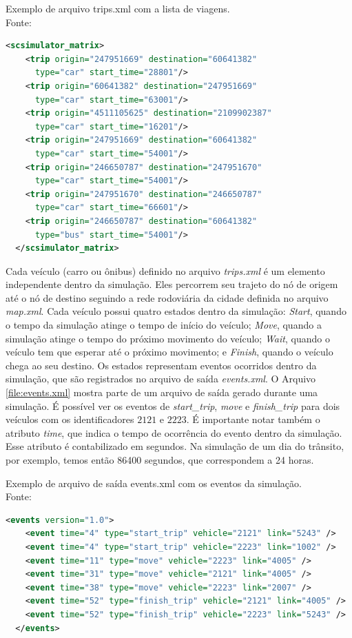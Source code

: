 {\begin{programruledcaption}{Exemplo de arquivo trips.xml com a lista de viagens. \\Fonte: \citet{mabs2017} \label{file:trips.xml}}
  \begin{lstlisting}[language=XML]
  <scsimulator_matrix>
    <trip origin="247951669" destination="60641382"
      type="car" start_time="28801"/>
    <trip origin="60641382" destination="247951669"
      type="car" start_time="63001"/>
    <trip origin="4511105625" destination="2109902387"
      type="car" start_time="16201"/>
    <trip origin="247951669" destination="60641382"
      type="car" start_time="54001"/>
    <trip origin="246650787" destination="247951670"
      type="car" start_time="54001"/>
    <trip origin="247951670" destination="246650787"
      type="car" start_time="66601"/>
    <trip origin="246650787" destination="60641382"
      type="bus" start_time="54001"/>
  </scsimulator_matrix>
  \end{lstlisting}
\end{programruledcaption}

  Cada veículo (carro ou ônibus) definido no arquivo \emph{trips.xml} é um
elemento independente dentro da simulação. Eles percorrem seu trajeto do nó de
origem até o nó de destino seguindo a rede rodoviária da cidade definida no
arquivo \emph{map.xml}.  Cada veículo possui quatro estados dentro da
simulação: \emph{Start}, quando o tempo da simulação atinge o tempo de início
do veículo; \emph{Move}, quando a simulação atinge o tempo do próximo movimento
do veículo; \emph{Wait}, quando o veículo tem que esperar até o próximo
movimento; e \emph{Finish}, quando o veículo chega ao seu destino. Os estados
representam eventos ocorridos dentro da simulação, que são registrados no
arquivo de saída \emph{events.xml}. O Arquivo \ref{file:events.xml} mostra parte de
um arquivo de saída gerado durante uma simulação. É possível ver os eventos de
\emph{start\_trip}, \emph{move} e \emph{finish\_trip} para dois veículos com os
identificadores $2121$ e $2223$.  É importante notar também o atributo
\emph{time}, que indica o tempo de ocorrência do evento dentro da simulação.
Esse atributo  é contabilizado em segundos. Na simulação de um dia do trânsito,
por exemplo, temos então 86400 segundos, que correspondem a 24 horas.

\begin{programruledcaption}{Exemplo de arquivo de saída events.xml com os eventos da simulação. \\Fonte: \citet{mabs2017} \label{file:events.xml}}
  \begin{lstlisting}[language=XML]
  <events version="1.0">
    <event time="4" type="start_trip" vehicle="2121" link="5243" />
    <event time="4" type="start_trip" vehicle="2223" link="1002" />
    <event time="11" type="move" vehicle="2223" link="4005" />
    <event time="31" type="move" vehicle="2121" link="4005" />
    <event time="38" type="move" vehicle="2223" link="2007" />
    <event time="52" type="finish_trip" vehicle="2121" link="4005" />
    <event time="52" type="finish_trip" vehicle="2223" link="5243" />
  </events>
  \end{lstlisting}
\end{programruledcaption}

}
